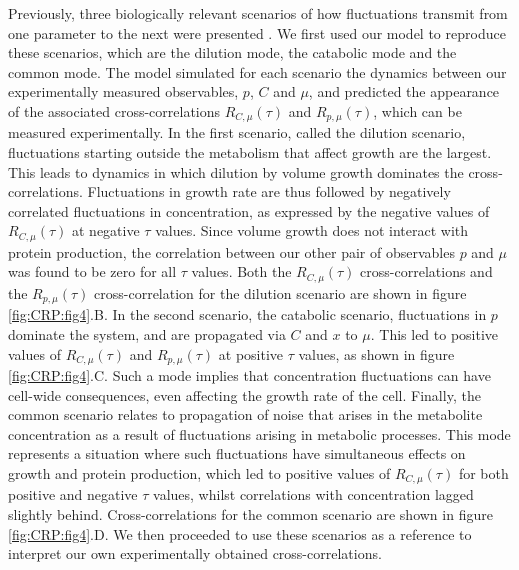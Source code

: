 Previously, three biologically relevant scenarios of how fluctuations transmit from one parameter to the next were presented \cite{Kiviet2014}.
%
We first used our model to reproduce these scenarios,
which are the dilution mode, the catabolic mode and the common mode.
%
The model simulated for each scenario the dynamics between our experimentally measured observables, $p$, $C$ and $\mu$,
and predicted the appearance of the associated cross-correlations %
 $R_{C,\mu}(\tau)$ and $R_{p,\mu}(\tau)$, which can be measured experimentally. %
%
In the first scenario, called the dilution scenario, 
fluctuations starting outside the metabolism that affect growth are the largest. 
This  leads to dynamics in which dilution by volume growth dominates the cross-correlations.
Fluctuations in growth rate are thus followed by negatively correlated fluctuations in concentration, as expressed by the negative values of $R_{C,\mu}(\tau)$ at negative $\tau$ values.
Since volume growth does not interact with protein production, the correlation between our other pair of observables $p$ and $\mu$ was found to be zero for all $\tau$ values.
Both the $R_{C,\mu}(\tau)$ cross-correlations and the $R_{p,\mu}(\tau)$ cross-correlation for the dilution scenario are shown in figure \ref{fig:CRP:fig4}.B.
%
In the second scenario, the catabolic scenario,
fluctuations in $p$ dominate the system, and are propagated via $C$ and $x$ to $\mu$.
This led to  positive values of $R_{C,\mu}(\tau)$ and $R_{p,\mu}(\tau)$ at positive $\tau$ values, 
as shown in figure \ref{fig:CRP:fig4}.C.
Such a mode implies that concentration fluctuations can have cell-wide consequences, even affecting the growth rate of the cell.
%
Finally, the common scenario relates to propagation of noise that arises in the metabolite concentration as a result of fluctuations arising in metabolic processes.
This mode represents a situation where such fluctuations have simultaneous effects on growth and protein production, which led to positive values of $R_{C,\mu}(\tau)$ for both 
positive and negative $\tau$ values, whilst correlations with concentration lagged slightly behind.
Cross-correlations for the common scenario are shown in figure \ref{fig:CRP:fig4}.D.
%
We then proceeded to use these scenarios as a reference to interpret our own experimentally obtained cross-correlations.

